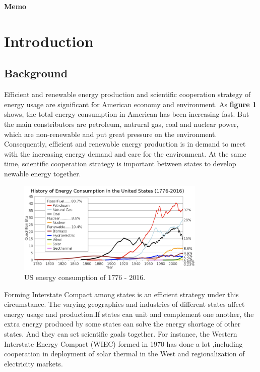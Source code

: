 \documentclass{mcmthesis}
\begin{document}
\maketitle
\noindent\centerline{\LARGE\bfseries Memo}

\newpage
\tableofcontents

\newpage

\section{Introduction}	
\subsection{Background}
  Efficient and renewable energy production and scientific cooperation strategy of energy usage are significant for American economy and environment. As \textbf{figure 1 }\cite{Energy} shows, the total energy consumption in American has been increasing fast. But the main constributors are petroleum, natrural gas, coal and nuclear power, which are non-renewable and put great pressure on the environment. Consequently, efficient and renewable energy production is in demand to meet with the increasing energy demand and care for the environment. At the same time, scientific cooperation strategy is important between states to develop newable energy together.
  \begin{figure}[htbp]
    \centering
    \includegraphics[width=0.8\textwidth]{figures//figure1.jpg}
    \caption{US energy consumption of 1776 - 2016.}
  \end{figure}

  Forming Interstate Compact among states is an efficient strategy under this circumstance. The varying geographies and industries of different states affect energy usage and production.If states can unit and complement one another, the extra energy produced by some states can solve the energy shortage of other states. And they can set scientific goals together. For instance, the Western Interstate Energy Compact (WIEC) formed in 1970 has done a lot ,including cooperation in deployment of solar thermal in the West and regionalization of electricity markets\cite{WIEC}.
\end{document}
